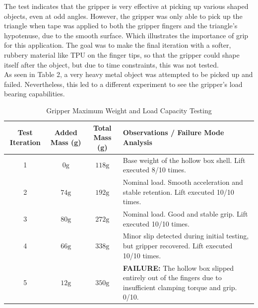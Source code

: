 The test indicates that the gripper is very effective at picking up various shaped objects, even at odd angles. However, the gripper was only able to pick up the triangle when tape was applied to both the gripper fingers and the triangle's hypotenuse, due to the smooth surface. Which illustrates the importance of grip for this application. The goal was to make the final iteration with a softer, rubbery material like TPU on the finger tips, so that the gripper could shape itself after the object, but due to time constraints, this was not tested. \\

As seen in Table 2, a very heavy metal object was attempted to be picked up and failed. Nevertheless, this led to a different experiment to see the gripper's load bearing capabilities.



\begin{table}[H]
    \centering
    \caption{Gripper Maximum Weight and Load Capacity Testing}
    \label{tab:load_capacity_test}
    \begin{tabular}{| c | c | c | p{7.5cm} |} 
        \hline
        \textbf{Test Iteration} & \textbf{Added Mass (g)} & \textbf{Total Mass (g)} & \textbf{Observations / Failure Mode Analysis} \\ \hline
        1 & $0\text{g}$ & $118\text{g}$ & Base weight of the hollow box shell. Lift executed 8/10 times. \\ \hline
        2 & $74\text{g}$ & $192\text{g}$ & Nominal load. Smooth acceleration and stable retention. Lift executed 10/10 times. \\ \hline
        3 & $80\text{g}$ & $272\text{g}$ & Nominal load. Good and stable grip. Lift executed 10/10 times. \\ \hline
        4 & $66\text{g}$ & $338\text{g}$ & Minor slip detected during initial testing, but gripper recovered. Lift executed 10/10 times.  \\ \hline
        \rowcolor{red!15} 5 & $12\text{g}$ & $350\text{g}$ & \textbf{FAILURE:} The hollow box slipped entirely out of the fingers due to insufficient clamping torque and grip. 0/10. \\ \hline
    \end{tabular}
\end{table}


